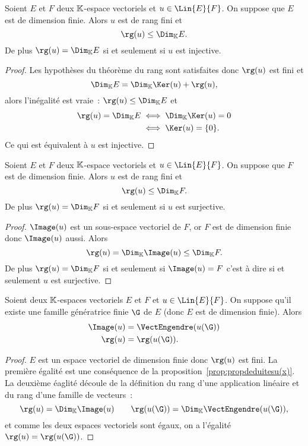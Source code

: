 \begin{theo}
  Soient $E$ et $F$ deux $\mathbb{K}$-espace vectoriels et $u \in \Lin{E}{F}$. On suppose que $E$ est de dimension finie. Alors $u$ est de rang fini et
  \begin{equation}
    \rg(u) \leq \Dim_\K E.
  \end{equation}
De plus $\rg(u) = \Dim_\K E$ si et seulement si $u$ est injective.
\end{theo}
\begin{proof}
  Les hypothèses du théorème du rang sont satisfaites donc $\rg(u)$ est fini et
  \begin{equation}
    \Dim_\K E = \Dim_\K \Ker(u) + \rg(u),
  \end{equation}
  alors l'inégalité est vraie~: $\rg(u) \leq \Dim_\K E$ et
  \begin{align}
    \rg(u) = \Dim_\K E &\iff \Dim_\K \Ker(u) = 0\\
    &\iff \Ker(u)=\{0\}.
  \end{align}
  Ce qui est équivalent à $u$ est injective.
\end{proof}

\begin{theo}
  Soient $E$ et $F$ deux $\mathbb{K}$-espace vectoriels et $u \in \Lin{E}{F}$. On suppose que $F$ est de dimension finie. Alors $u$ est de rang fini et
\begin{equation}
    \rg(u) \leq \Dim_\K F.
  \end{equation}
De plus $\rg(u) = \Dim_\K F$ si et seulement si $u$ est surjective.
\end{theo}
\begin{proof}
  $\Image(u)$ est un sous-espace vectoriel de $F$, or $F$ est de dimension finie donc $\Image(u)$ aussi. Alors
  \begin{equation}
    \rg(u) = \Dim_\K \Image(u) \leq \Dim_\K F.
  \end{equation}
  De plus $\rg(u) = \Dim_\K F$ si et seulement si $\Image(u)=F$ c'est à dire si et seulement $u$ est surjective.
\end{proof}

\begin{prop}
  Soient deux $\mathbb{K}$-espaces vectoriels $E$ et $F$ et $u \in \Lin{E}{F}$. On suppose qu'il existe une famille génératrice finie $\G$ de $E$ (donc $E$ est de dimension finie). Alors
  \begin{align}
    \Image(u) &= \VectEngendre(u(\G)) \\
    \rg(u) &= \rg(u(\G)).
  \end{align}
\end{prop}
\begin{proof}
  $E$ est un espace vectoriel de dimension finie donc $\rg(u)$ est fini. La première égalité est une conséquence de la proposition~\ref{prop:propdeduitesu(x)}. La deuxième éaglité découle de la définition du rang d'une application linéaire et du rang d'une famille de vecteurs~:
  \begin{equation}
    \rg(u) = \Dim_\K \Image(u) \qquad \rg(u(\G))=\Dim_\K \VectEngendre(u(\G)),
  \end{equation}
  et comme les deux espaces vectoriels sont égaux, on a l'égalité $\rg(u) = \rg(u(\G))$.
\end{proof}

